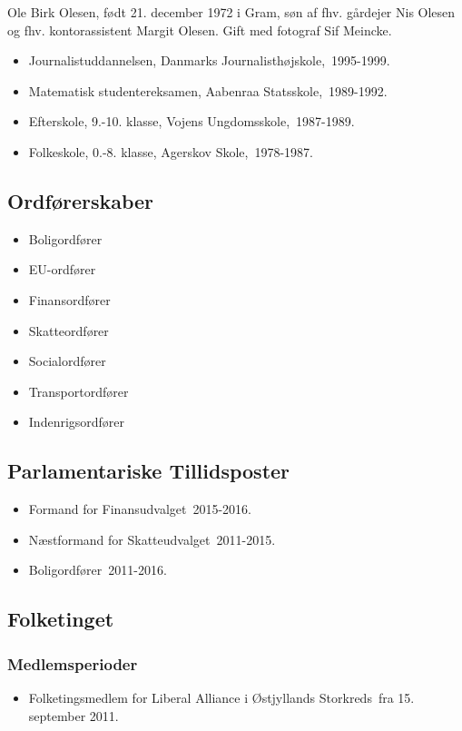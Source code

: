\documentclass[11pt, a4paper]{awesome-cv}
\begin{document}
\makecvheader[R]
\makelettertitle
\begin{cvletter}
Ole Birk Olesen, født 21. december 1972 i Gram, søn af fhv. gårdejer Nis Olesen og fhv. kontorassistent Margit Olesen. Gift med fotograf Sif Meincke.

\begin{itemize}
\item Journalistuddannelsen, Danmarks Journalisthøjskole, 1995-1999.
\item Matematisk studentereksamen, Aabenraa Statsskole, 1989-1992.
\item Efterskole, 9.-10. klasse, Vojens Ungdomsskole, 1987-1989.
\item Folkeskole, 0.-8. klasse, Agerskov Skole, 1978-1987.
\end{itemize}
\subsection*{Ordførerskaber}
\begin{itemize}
\item Boligordfører
\item EU-ordfører
\item Finansordfører
\item Skatteordfører
\item Socialordfører
\item Transportordfører
\item Indenrigsordfører
\end{itemize}
\subsection*{Parlamentariske Tillidsposter}
\begin{itemize}
\item Formand for Finansudvalget 2015-2016.
\item Næstformand for Skatteudvalget 2011-2015.
\item Boligordfører 2011-2016.
\end{itemize}
\subsection*{Folketinget}
\subsubsection*{Medlemsperioder}
\begin{itemize}
\item Folketingsmedlem for Liberal Alliance i Østjyllands Storkreds fra 15. september 2011.
\end{itemize}

\end{cvletter}
\end{document}
